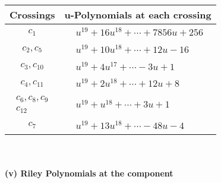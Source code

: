 \documentclass[1p]{elsarticle_modified}
\theoremstyle{definition}
\begin{document}
\begin{tabular}{m{50pt}|m{274pt}}
Crossings & \hspace{64pt}u-Polynomials at each crossing \\
\hline $$\begin{aligned}c_{1}\end{aligned}$$&$\begin{aligned}
&u^{19}+16 u^{18}+\cdots+7856 u+256
\end{aligned}$\\
\hline $$\begin{aligned}c_{2},c_{5}\end{aligned}$$&$\begin{aligned}
&u^{19}+10 u^{18}+\cdots+12 u-16
\end{aligned}$\\
\hline $$\begin{aligned}c_{3},c_{10}\end{aligned}$$&$\begin{aligned}
&u^{19}+4 u^{17}+\cdots-3 u+1
\end{aligned}$\\
\hline $$\begin{aligned}c_{4},c_{11}\end{aligned}$$&$\begin{aligned}
&u^{19}+2 u^{18}+\cdots+12 u+8
\end{aligned}$\\
\hline $$\begin{aligned}c_{6},c_{8},c_{9}\\c_{12}\end{aligned}$$&$\begin{aligned}
&u^{19}+u^{18}+\cdots+3 u+1
\end{aligned}$\\
\hline $$\begin{aligned}c_{7}\end{aligned}$$&$\begin{aligned}
&u^{19}+13 u^{18}+\cdots-48 u-4
\end{aligned}$\\
\hline
\end{tabular}\\~\\
\newpage\renewcommand{\arraystretch}{1}
\flushleft \textbf{(v) Riley Polynomials at the component}\newline \\
\end{document}
